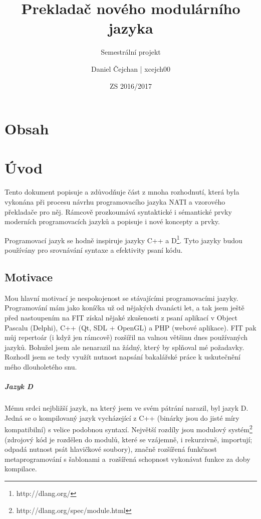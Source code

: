 




\setlength\extrarowheight{2pt}

\title{Prekladač nového modulárního jazyka}
\subtitle{Semestrální projekt}
\author{Daniel Čejchan | xcejch00}
\date{ZS 2016/2017}



\mainpage

\chapter{Obsah}
\makeatletter
{}
\makeatother

\chapter{Úvod}
Tento dokument popisuje a zdůvodňuje část z mnoha rozhodnutí, která byla vykonána při procesu návrhu programovacího jazyka NATI a vzorového překladače pro něj. Rámcově prozkoumává syntaktické i sémantické prvky moderních programovacích jazyků a popisuje i nové koncepty a prvky.

Programovací jazyk se hodně inspiruje jazyky C++ a D\footnote{http://dlang.org/}. Tyto jazyky budou používány pro srovnávání syntaxe a efektivity psaní kódu.

\section{Motivace}
Mou hlavní motivací je nespokojenost se stávajícími programovacími jazyky. Programování mám jako koníčka už od nějakých dvanácti let, a tak jsem ještě před nastoupením na FIT získal nějaké zkušenosti z psaní aplikací v Object Pascalu (Delphi), C++ (Qt, SDL + OpenGL) a PHP (webové aplikace). FIT pak můj repertoár (i když jen rámcově) rozšířil na valnou většinu dnes používaných jazyků. Bohužel jsem ale nenarazil na žádný, který by splňoval mé požadavky. Rozhodl jsem se tedy využít nutnost napsání bakalářské práce k uskutečnění mého dlouholetého snu.

\paragraph{Jazyk D}
Mému srdci nejbližší jazyk, na který jsem ve svém pátrání narazil, byl jazyk D. Jedná se o kompilovaný jazyk vycházející z C++ (binárky jsou do jisté míry kompatibilní) s velice podobnou syntaxí. Největší rozdíly jsou modulový systém\footnote{http://dlang.org/spec/module.html} (zdrojový kód je rozdělen do modulů, které se vzájemně, i rekurzivně, importují; odpadá nutnost psát hlavičkové soubory), značně rozšířená funkčnost metaprogramování s šablonami a~rozšířená schopnost vykonávat funkce za doby kompilace.

